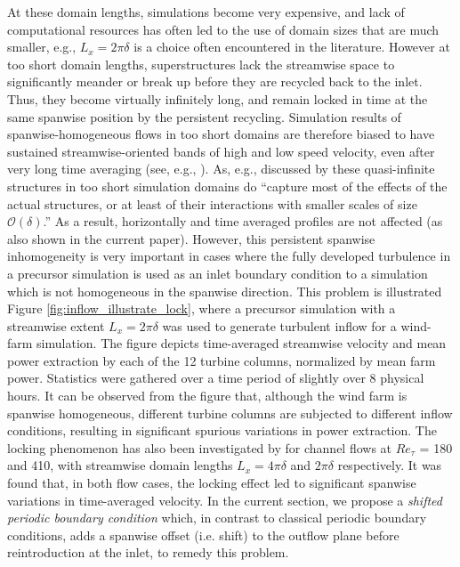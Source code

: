 At these domain lengths, simulations become very expensive, and lack of computational resources has often led to the use of domain sizes that are much
smaller, e.g., $L_x=2\pi\delta$ is a choice often encountered in the literature. However at too short domain lengths, superstructures lack the
streamwise space to significantly meander or break up before they are recycled back to the inlet. Thus, they become virtually infinitely long, and
remain locked in time at the same spanwise position by the persistent recycling. Simulation results of spanwise-homogeneous flows in too short domains
are therefore biased to have sustained streamwise-oriented bands of high and low speed velocity, even after very long time averaging (see, e.g.,
\citealp{lu2010modulated, verhulst2014large, alqadi2015large}). As, e.g., discussed by \cite{lozanoduran2014effect} these quasi-infinite structures in
too short simulation domains do ``capture most of the effects of the actual structures, or at least of their interactions with smaller scales of size
$\mathcal{O}(\delta)$.'' As a result, horizontally and time averaged profiles are not affected (as also shown in the current paper). However, this
persistent spanwise inhomogeneity is very important in cases where the fully developed turbulence in a precursor simulation is used as an inlet
boundary condition to a simulation which is not homogeneous in the spanwise direction. This problem is illustrated Figure
\ref{fig:inflow_illustrate_lock}, where a precursor simulation with a streamwise extent $L_x=2\pi\delta$ was used to generate turbulent inflow for a
wind-farm simulation. The figure depicts time-averaged streamwise velocity and mean power extraction by each of the 12 turbine columns, normalized by
mean farm power. Statistics were gathered over a time period of slightly over 8 physical hours. It can be observed from the figure that, although the
wind farm is spanwise homogeneous, different turbine columns are subjected to different inflow conditions, resulting in significant spurious variations in power extraction. 
The locking phenomenon has also been investigated by \cite{fishpool2009persistent} for channel flows at $Re_\tau$ = 180 and 410, with streamwise
domain lengths $L_x = 4\pi\delta$ and $2\pi\delta$ respectively. It was found that, in both flow cases, the locking effect led to significant spanwise
variations in time-averaged velocity. In the current section, we propose a \emph{shifted periodic boundary condition} which, in contrast to classical
periodic boundary conditions, adds a spanwise offset (i.e. shift) to the outflow plane before reintroduction at the inlet, to remedy this problem. 

